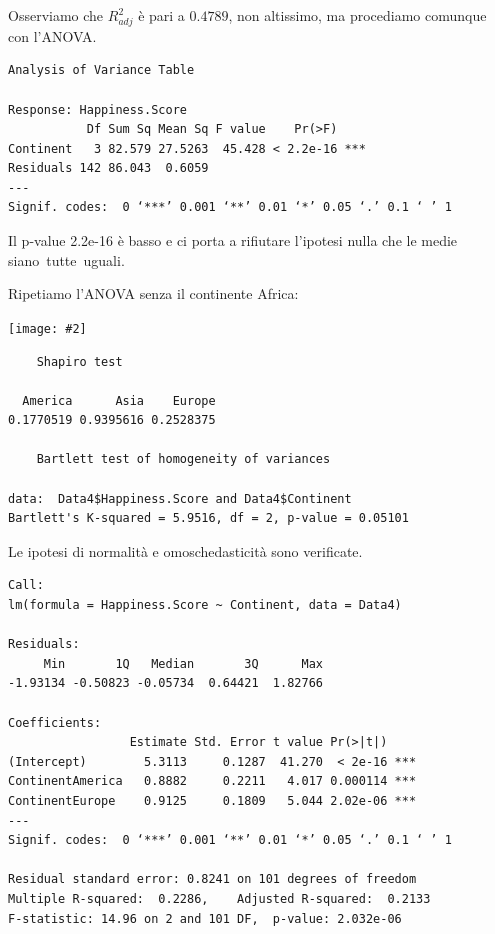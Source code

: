 \documentclass{beamer}
\newcommand{\fg}[2]{%
  \begin{center}
      \texttt{[image: \#2]}%
  \end{center}
}
\begin{document}
\begin{frame}[fragile]
    Osserviamo che $R^2_{adj}$ è pari a $0.4789$, non altissimo, ma procediamo comunque con l'ANOVA.

    \bigskip

    \tiny
    \begin{verbatim}
Analysis of Variance Table

Response: Happiness.Score
           Df Sum Sq Mean Sq F value    Pr(>F)    
Continent   3 82.579 27.5263  45.428 < 2.2e-16 ***
Residuals 142 86.043  0.6059                      
---
Signif. codes:  0 ‘***’ 0.001 ‘**’ 0.01 ‘*’ 0.05 ‘.’ 0.1 ‘ ’ 1
    \end{verbatim}

    \normalsize Il p-value 2.2e-16 è basso e ci porta a rifiutare l'ipotesi nulla che le medie siano tutte uguali.
\end{frame}

\begin{frame}[fragile]
    Ripetiamo l'ANOVA senza il continente Africa:
     \fg{0.6}{box3}
\end{frame}

\begin{frame}[fragile]
    \tiny
    \begin{verbatim}
    Shapiro test

  America      Asia    Europe 
0.1770519 0.9395616 0.2528375

    Bartlett test of homogeneity of variances

data:  Data4$Happiness.Score and Data4$Continent
Bartlett's K-squared = 5.9516, df = 2, p-value = 0.05101
    \end{verbatim}

    \normalsize Le ipotesi di normalità e omoschedasticità sono verificate.
\end{frame}

\begin{frame}[fragile]
    \tiny
    \begin{verbatim}
Call:
lm(formula = Happiness.Score ~ Continent, data = Data4)

Residuals:
     Min       1Q   Median       3Q      Max 
-1.93134 -0.50823 -0.05734  0.64421  1.82766 

Coefficients:
                 Estimate Std. Error t value Pr(>|t|)    
(Intercept)        5.3113     0.1287  41.270  < 2e-16 ***
ContinentAmerica   0.8882     0.2211   4.017 0.000114 ***
ContinentEurope    0.9125     0.1809   5.044 2.02e-06 ***
---
Signif. codes:  0 ‘***’ 0.001 ‘**’ 0.01 ‘*’ 0.05 ‘.’ 0.1 ‘ ’ 1

Residual standard error: 0.8241 on 101 degrees of freedom
Multiple R-squared:  0.2286,    Adjusted R-squared:  0.2133 
F-statistic: 14.96 on 2 and 101 DF,  p-value: 2.032e-06 
    \end{verbatim}
\end{frame}
\end{document}
